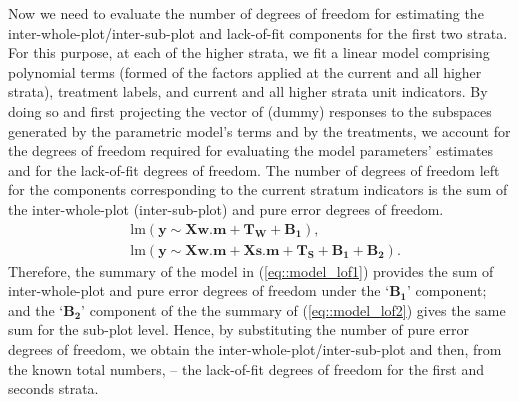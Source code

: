 Now we need to evaluate the number of degrees of freedom for estimating the inter-whole-plot/inter-sub-plot and lack-of-fit components for the first two strata. For this purpose, at each of the higher strata, we fit a linear model comprising polynomial terms (formed of the factors applied at the current and all higher strata), treatment labels, and current and all higher strata unit indicators. By doing so and first projecting the vector of (dummy) responses to the subspaces generated by the parametric model's terms and by the treatments, we account for the degrees of freedom required for evaluating the model parameters' estimates and for the lack-of-fit degrees of freedom. The number of degrees of freedom left for the components corresponding to the current stratum indicators is the sum of the inter-whole-plot (inter-sub-plot) and pure error degrees of freedom. 
\begin{align}
\label{eq::model_lof1}
&\mathrm{lm}(\bm{y}\sim\bm{Xw.m}+\bm{T_{W}}+\bm{B_1}),\\
\label{eq::model_lof2}
&\mathrm{lm}(\bm{y}\sim\bm{Xw.m}+\bm{Xs.m}+\bm{T_{S}}+\bm{B_1}+\bm{B_2}).
\end{align}
Therefore, the summary of the model in (\ref{eq::model_lof1}) provides the sum of inter-whole-plot and pure error degrees of freedom under the `$\bm{B_1}$' component; and the `$\bm{B_2}$' component of the the summary of (\ref{eq::model_lof2}) gives the same sum for the sub-plot level. Hence, by substituting the number of pure error degrees of freedom, we obtain the inter-whole-plot/inter-sub-plot and then, from the known total numbers, -- the lack-of-fit degrees of freedom for the first and seconds strata.  

